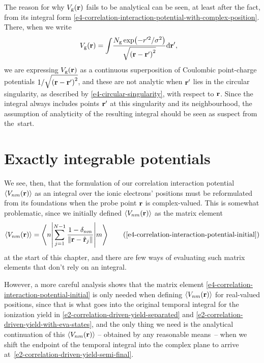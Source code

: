 The reason for why $V_\mathrm{g}(\vb{r})$ fails to be analytical can be seen, at least after the fact, from its integral form \eqref{e4-correlation-interaction-potential-with-complex-position}. There, when we write
\begin{align}
V_\mathrm{g}(\vb{r})
& =
\int\!
\frac{
  N_\mathrm{g} \exp(-r'^2/\sigma^2)
  }{
  \sqrt{ \left( \vb{r}-\vb{r}' \right)^2}
  }
\mathrm{d}\vb{r}'
,
\label{e4-correlation-interaction-potential-for-analyticity}
\end{align}
we are expressing $V_\mathrm{g}(\vb{r})$ as a continuous superposition of Coulombic point-charge potentials $1/\sqrt{ \left( \vb{r}-\vb{r}' \right)^2}$, and these are not analytic when $\vb{r}'$ lies in the circular singularity, as described by \eqref{e4-circular-singularity}, with respect to $\vb{r}$. Since the integral always includes points $\vb{r}'$ at this singularity and its neighbourhood, the assumption of analyticity of the resulting integral should be seen as suspect from the~start.







\section{Exactly integrable potentials}
We see, then, that the formulation of our correlation interaction potential $\left\langle V_{nm}\mathopen{}\left( \vb{r} \right)\mathclose{} \right\rangle$ as an integral over the ionic electrons' positions must be reformulated from its foundations when the probe point $\vb{r}$ is complex-valued. This is somewhat problematic, since we initially defined $\left\langle V_{nm}\mathopen{}\left( \vb{r} \right)\mathclose{} \right\rangle$ as the matrix element 
\begin{equation}
\Vnm{\vbr}=\matrixel**{n}{\sum_{j=1}^{N-1} \frac{1-\delta_{nm}}{\| \vbr - \hat{\vbr}_j\|} }{m}
\backtag{e4-correlation-interaction-potential-initial}
\end{equation}
at the start of this chapter, and there are few ways of evaluating such matrix elements that don't rely on an integral. 

However, a more careful analysis shows that the matrix element \eqref{e4-correlation-interaction-potential-initial} is only needed when defining $\left\langle V_{nm}\mathopen{}\left( \vb{r} \right)\mathclose{} \right\rangle$ for real-valued positions, since that is what goes into the original temporal integral for the ionization yield in \eqref{e2-correlation-driven-yield-separated} and \eqref{e2-correlation-driven-yield-with-eva-states}, and the only thing we need is the analytical continuation of this $\left\langle V_{nm}\mathopen{}\left( \vb{r} \right)\mathclose{} \right\rangle$ -- obtained by any reasonable means~-- when we shift the endpoint of the temporal integral into the complex plane to arrive at~\eqref{e2-correlation-driven-yield-semi-final}. 


